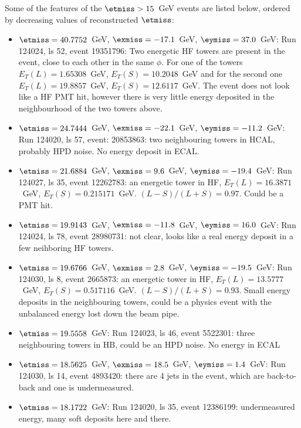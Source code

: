 Some of the features of the $\etmiss>15$~GeV events are listed below,
ordered by decreasing values of reconstructed $\etmiss$:
\begin{itemize}
\item $\etmiss=40.7752$~GeV, $\exmiss=-17.1$~GeV, $\eymiss=37.0$~GeV:
  Run 124024, ls 52, event 19351796: Two energetic HF towers are present
  in the event, close to each other in the same $\phi$. For one of the
  towers $E_{T}(L)=1.65308$~GeV, $E_{T}(S)=10.2048$~GeV and for the
  second one $E_{T}(L)=19.8857$~GeV, $E_{T}(S)=12.6117$~GeV. The event
  does not look like a HF PMT hit, however there is very little energy
  deposited in the neighbourhood of the two towers above.

\item $\etmiss=24.7444$~GeV, $\exmiss=-22.1$~GeV, $\eymiss=-11.2$~GeV:
  Run 124020, ls 57, event: 20853863: two neighbouring towers in HCAL,
  probably HPD noise. No energy deposit in ECAL.

\item $\etmiss=21.6884$~GeV, $\exmiss=9.6$~GeV, $\eymiss=-19.4$~GeV: Run
  124027, ls 35, event 12262783: an energetic tower in HF,
  $E_{T}(L)=16.3871$~GeV,
  $E_{T}(S)=0.215171$~GeV. $(L-S)/(L+S)=0.97$. Could be a PMT hit.

\item $\etmiss=19.9143$~GeV, $\exmiss=-11.8$~GeV, $\eymiss=16.0$~GeV:
  Run 124024, ls 78, event 28980731: not clear, looks like a real energy
  deposit in a few neihboring HF towers.

\item $\etmiss=19.6766$~GeV, $\exmiss=2.8$~GeV, $\eymiss=-19.5$~GeV: Run
  124030, ls 8, event 2665873: an energetic tower in HF, $E_{T}(L)=
  13.5777$~GeV, $E_{T}(S)=0.517116$~GeV. $(L-S)/(L+S)=0.93$. Small
  energy deposits in the neighbouring towers, could be a physics event
  with the unbalanced energy lost down the beam pipe.

\item $\etmiss=19.5558 $~GeV: Run 124023, ls 46, event 5522301: three
  neighbouring towers in HB, could be an HPD noise. No energy in ECAL

\item $\etmiss=18.5625$~GeV, $\exmiss=18.5$~GeV, $\eymiss=1.4$~GeV: Run
  124030, ls 14, event 4893420: there are 4 jets in the event, which are
  back-to-back and one is undermeasured.

\item $\etmiss=18.1722$~GeV: Run 124020, ls 35, event 12386199:
  undermeasured energy, many soft deposits here and there.


\end{itemize}
